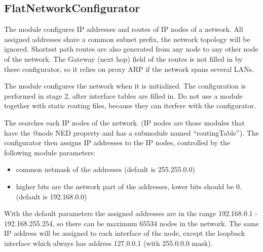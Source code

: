 \subsection{FlatNetworkConfigurator}

The  module configures
IP addresses and routes of IP nodes of a network.
All assigned addresses share a common subnet prefix,
the network topology will be ignored. Shortest path
routes are also generated from any node to any other
node of the network. The Gateway (next hop) field of the routes
is not filled in by these configurator, so it relies
on proxy ARP if the network spans several LANs.


The  module configures
the network when it is initialized. The configuration
is performed in stage 2, after interface tables are
filled in. Do not use a 
module together with static routing files, because they
can iterfere with the configurator.

The  searches each IP nodes of the network.
(IP nodes are those modules that have the @node NED property and
has a  submodule named ``routingTable'').
The configurator then assigns IP addresses to the IP nodes, controlled
by the following module parameters:
\begin{itemize}
  \item {} common netmask of the addresses (default is 255.255.0.0)
  \item {} higher bits are the network part of the addresses,
        lower bits should be 0. (default is 192.168.0.0)
\end{itemize}

With the default parameters the assigned addresses are in the range
192.168.0.1 - 192.168.255.254, so there can be maximum 65534 nodes in the
network. The same IP address will be assigned to each interface
of the node, except the loopback interface which always has address 127.0.0.1
(with 255.0.0.0 mask).

